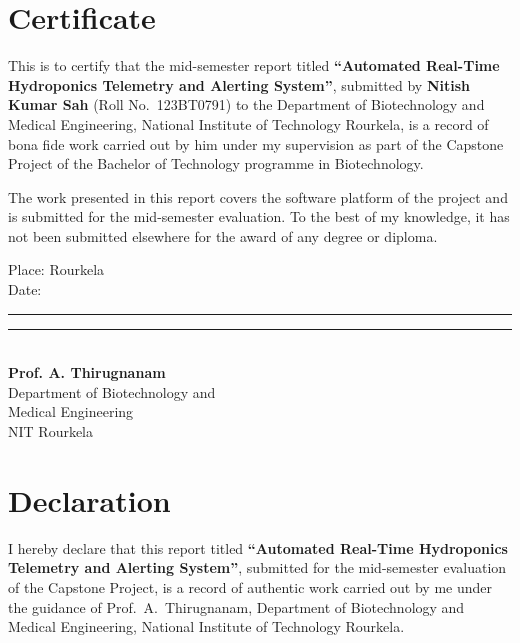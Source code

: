 \documentclass[11pt,a4paper,oneside]{report}
\begin{document}
\setcounter{page}{2}

\chapter*{Certificate}
This is to certify that the mid-semester report titled \textbf{``Automated Real-Time
Hydroponics Telemetry and Alerting System''}, submitted by \textbf{Nitish Kumar Sah}
(Roll No.\ 123BT0791) to the Department of Biotechnology and Medical Engineering,
National Institute of Technology Rourkela, is a record of bona fide work carried out
by him under my supervision as part of the Capstone Project of the Bachelor of
Technology programme in Biotechnology.

The work presented in this report covers the software platform of the project and is
submitted for the mid-semester evaluation. To the best of my knowledge, it has not been
submitted elsewhere for the award of any degree or diploma.

\vspace{2.2cm}
\noindent
\begin{minipage}[t]{0.48\linewidth}
Place: Rourkela\\
Date: \rule{3.2cm}{0.4pt}
\end{minipage}\hfill
\begin{minipage}[t]{0.45\linewidth}\raggedleft
\rule{5cm}{0.4pt}\\
\textbf{Prof. A. Thirugnanam}\\
Department of Biotechnology and\\ Medical Engineering\\
NIT Rourkela
\end{minipage}
\clearpage

\chapter*{Declaration}
I hereby declare that this report titled \textbf{``Automated Real-Time Hydroponics
Telemetry and Alerting System''}, submitted for the mid-semester evaluation of the
Capstone Project, is a record of authentic work carried out by me under the guidance
of Prof.\ A.\ Thirugnanam, Department of Biotechnology and Medical Engineering,
National Institute of Technology Rourkela.
\end{document}
